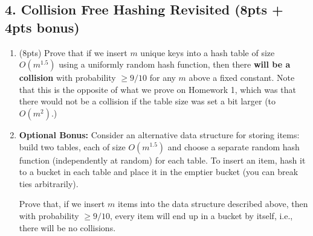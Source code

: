 \documentclass[10pt]{article}
\begin{document}
\subsection{4. Collision Free Hashing Revisited (\textbf {\small 8pts + 4pts bonus})}
\begin{enumerate}[label=(\alph*)]
	\item (8pts) Prove that if we insert $m$ unique keys into a hash table of size  $O(m^{1.5})$ using a uniformly random hash function, then there \textbf{will be a collision} with probability $\geq 9/10$ for any $m$ above a fixed constant. Note that this is the opposite of what we prove on Homework 1, which was that there would not be a collision if the table size was set a bit larger (to $O(m^2)$.)
\vspace{60em}
	\item \textbf{Optional Bonus:}
	Consider an alternative data structure for storing items: build two tables, each of size $O(m^{1.5})$ and choose a separate random hash function (independently at random) for each table. To insert an item, hash it to a bucket in each table and place it in the emptier bucket (you can break ties arbitrarily).\vspace{2em}

	Prove that, if we insert $m$ items into the data structure described above, then with probability $\geq 9/10$, every item will end up in a bucket by itself, i.e., there will be no collisions.
\end{enumerate}
\end{document}
